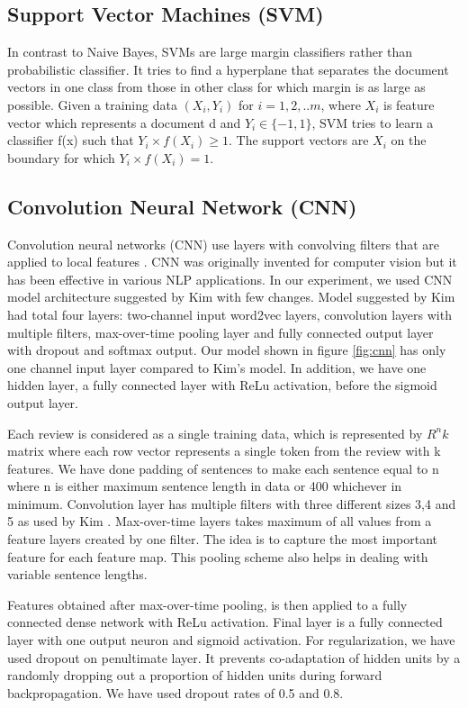 \documentclass[11pt]{article}
\begin{document}
		\subsection{Support Vector Machines (SVM)}
		In contrast to Naive Bayes, SVMs are large margin classifiers rather than probabilistic classifier. It tries to find a hyperplane that separates the document vectors in one class from those in other class for which margin is as large as possible. Given a training data $(X_i, Y_i)$ for $i=1,2,..m$, where $X_i$ is feature vector which represents a document d and $Y_i \in \{-1, 1\}$, SVM tries to learn a classifier f(x) such that $Y_i \times f(X_i) \geq 1$. The support vectors are $X_i$ on the boundary for which $Y_i \times f(X_i) = 1$.
		
		\subsection{Convolution Neural Network (CNN)}
		Convolution neural networks (CNN) use layers with convolving filters that are applied to local features \cite{lecun}. CNN was originally invented for computer vision but it has been effective in various NLP applications. In our experiment, we used CNN model architecture suggested by Kim \cite{kim} with few changes. Model suggested by Kim \cite{kim} had total four layers: two-channel input word2vec layers, convolution layers with multiple filters, max-over-time pooling layer and fully connected output layer with dropout and softmax output. Our model shown in figure \ref{fig:cnn} has only one channel input layer compared to Kim's model. In addition, we have one hidden layer, a fully connected layer with ReLu activation, before the sigmoid output layer. 
		
		Each review is considered as a single training data, which is represented by $R^nk$ matrix where each row vector represents a single token from the review with k features. We have done padding of sentences to make each sentence equal to n where n is either maximum sentence length in data or 400 whichever in minimum. Convolution layer has multiple filters with three different sizes 3,4 and 5 as used by Kim \cite{kim}. Max-over-time layers takes maximum of all values from a feature layers created by one filter. The idea is to capture the most important feature for each feature map. This pooling scheme also helps in dealing with variable sentence lengths. 
		
		Features obtained after max-over-time pooling, is then applied to a fully connected dense network with ReLu activation. Final layer is a fully connected layer with one output neuron and sigmoid activation. For regularization, we have used dropout on penultimate layer. It prevents co-adaptation of hidden units by a randomly dropping out a proportion of hidden units during forward backpropagation. We have used dropout rates of 0.5 and 0.8. 
		
\end{document}

